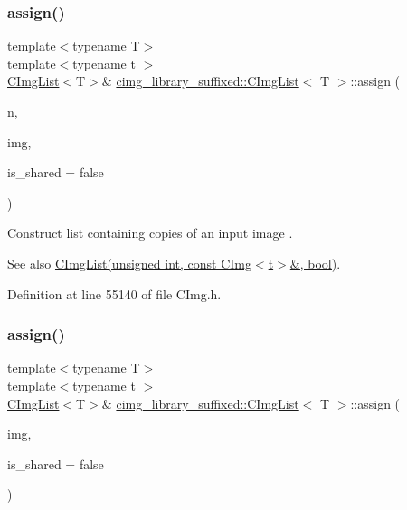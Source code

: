 \subsubsection{\texorpdfstring{assign()}{assign()}\hspace{0.1cm}{\footnotesize\ttfamily [7/18]}}
{\footnotesize\ttfamily template$<$typename T$>$ \\
template$<$typename t $>$ \\
\hyperlink{structcimg__library__suffixed_1_1CImgList}{C\+Img\+List}$<$T$>$\& \hyperlink{structcimg__library__suffixed_1_1CImgList}{cimg\+\_\+library\+\_\+suffixed\+::\+C\+Img\+List}$<$ T $>$\+::assign (\begin{DoxyParamCaption}\item[{const unsigned int}]{n,  }\item[{const \hyperlink{structcimg__library__suffixed_1_1CImg}{C\+Img}$<$ t $>$ \&}]{img,  }\item[{const bool}]{is\+\_\+shared = {\ttfamily false} }\end{DoxyParamCaption})\hspace{0.3cm}{\ttfamily [inline]}}



Construct list containing copies of an input image . 

\begin{DoxySeeAlso}{See also}
\hyperlink{structcimg__library__suffixed_1_1CImgList_adb1654540088f63758dbed91220cb5f1}{C\+Img\+List(unsigned int, const C\+Img$<$t$>$\&, bool)}. 
\end{DoxySeeAlso}


Definition at line 55140 of file C\+Img.\+h.

\mbox{\label{structcimg__library__suffixed_1_1CImgList_a5db2c1a3ac413e7dadb7ee4cb9a555b3}} 
\subsubsection{\texorpdfstring{assign()}{assign()}\hspace{0.1cm}{\footnotesize\ttfamily [8/18]}}
{\footnotesize\ttfamily template$<$typename T$>$ \\
template$<$typename t $>$ \\
\hyperlink{structcimg__library__suffixed_1_1CImgList}{C\+Img\+List}$<$T$>$\& \hyperlink{structcimg__library__suffixed_1_1CImgList}{cimg\+\_\+library\+\_\+suffixed\+::\+C\+Img\+List}$<$ T $>$\+::assign (\begin{DoxyParamCaption}\item[{const \hyperlink{structcimg__library__suffixed_1_1CImg}{C\+Img}$<$ t $>$ \&}]{img,  }\item[{const bool}]{is\+\_\+shared = {\ttfamily false} }\end{DoxyParamCaption})\hspace{0.3cm}{\ttfamily [inline]}}



